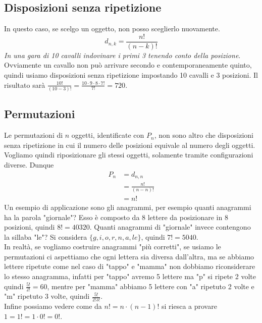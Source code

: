 \documentclass[11pt]{report}
\begin{document}
\subsection{Disposizioni senza ripetizione}
In questo caso, se scelgo un oggetto, non posso sceglierlo nuovamente.
\begin{equation}
    d_{n,k} = \frac{n!}{(n-k)!}
\end{equation}
\textit{In una gara di 10 cavalli indovinare i primi 3 tenendo conto della posizione}. Ovviamente un cavallo non può arrivare secondo e contemporaneamente quinto, quindi usiamo disposizioni senza ripetizione impostando 10 cavalli e 3 posizioni. Il risultato sarà $\frac{10!}{(10-3)!} = \frac{10 \cdot 9 \cdot 8 \cdot 7!}{7!} = 720$.
\subsection{Permutazioni}
Le permutazioni di $n$ oggetti, identificate con $P_{n}$, non sono altro che disposizioni senza ripetizione in cui il numero delle posizioni equivale al numero degli oggetti. Vogliamo quindi riposizionare gli stessi oggetti, solamente tramite configurazioni diverse. Dunque
\begin{equation}
    \begin{split}
        P_n & = d_{n,n}\\
        & = \frac{n!}{(n-n)!}\\
        & = n!
    \end{split}
\end{equation}
Un esempio di applicazione sono gli anagrammi, per esempio quanti anagrammi ha la parola "giornale"? Esso è composto da 8 lettere da posizionare in 8 posizioni, quindi $8! = 40320$. Quanti anagrammi di "giornale" invece contengono la sillaba "le"? Si considera $\{g,i,o,r,n,a,le\}$, quindi $7! = 5040$.\\
In realtà, se vogliamo costruire anagrammi "più corretti", se usiamo le permutazioni ci aspettiamo che ogni lettera sia diversa dall'altra, ma se abbiamo lettere ripetute come nel caso di "tappo" e "mamma" non dobbiamo riconsiderare lo stesso anagramma, infatti per "tappo" avremo 5 lettere ma "p" si ripete 2 volte quindi $\frac{5!}{2!} = 60$, mentre per "mamma" abbiamo 5 lettere con "a" ripetuto 2 volte e "m" ripetuto 3 volte, quindi $\frac{5!}{2!3!}$.\\
Infine possiamo vedere come da $n! = n \cdot (n-1)!$ si riesca a provare $1 = 1! = 1 \cdot 0! = 0!$.
\end{document}
